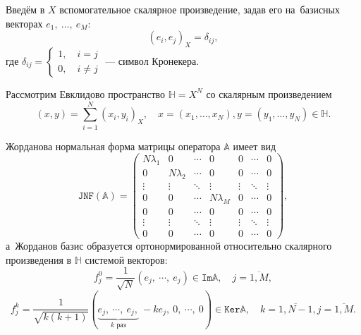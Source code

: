 Введём в \( X \) вспомогательное скалярное произведение, задав его на~базисных векторах
\( e_1,~\ldots,~e_M \):
\[ (e_i,e_j)_X = \delta_{ij}, \]
где \( \delta_{ij} = \left\{\begin{aligned} 1, \quad i=j\\ 0, \quad i\neq j\end{aligned}\right. \) --- символ Кронекера.

Рассмотрим Евклидово пространство \( \mathbb{H}=X^N \)
со скалярным произведением
\[ (x, y) = \sum_{i=1}^N (x_i,y_i)_X, \quad x=(x_1,\ldots,x_N),y=(y_1,\ldots,y_N) \in \mathbb{H}. \] 


 \begin{theorem}
     Жорданова нормальная форма матрицы оператора \( \mathbb{A} \)
     имеет вид
     \begin{equation}\label{eq:ideal:jnf}
         \mathtt{JNF}(\mathbb{A})=
         \left(\begin{array}{cccc|ccc}
             N\lambda_1 & 0  & \cdots & 0 & 0 & \cdots & 0 \\
             0 & N\lambda_2  & \cdots & 0 & 0 & \cdots & 0 \\
             \vdots & \vdots & \ddots & \vdots & \vdots & \ddots & \vdots \\
             0 & 0 & \cdots  & N\lambda_M & 0 & \cdots & 0 \\
             \hline
             0 & 0 & \cdots  & 0 & 0 & \cdots & 0 \\
             \vdots & \vdots & \ddots & \vdots & \vdots & \ddots & \vdots \\
             0 & 0 & \cdots  & 0 & 0 & \cdots & 0
        \end{array}\right),
     \end{equation}
     а~Жорданов базис образуется ортонормированной относительно скалярного произведения в \( \mathbb{H} \) системой векторов:
     \begin{equation}\label{eq:ideal:jbasis-im}
         f_j^0 = \frac{1}{\sqrt{N}}\left( e_j,~\cdots,~e_j\right)\in\mathtt{Im}\mathbb{A},\quad
     j=\overline{1,M}, \end{equation}
     \begin{equation}\label{eq:ideal:jbasis-ker}
         f_j^k = \frac{1}{\sqrt{k(k+1)}}
                ({
                    \underbrace{e_j, ~ \cdots, ~ e_j,}_{ k \text{ раз}} ~ -ke_j, ~ 0, ~ \cdots, ~ 0
                    })
                    \in\mathtt{Ker}\mathbb{A},
                    \quad k=\overline{1,N-1},j=\overline{1,M}
     .\end{equation} %
 \end{theorem}
